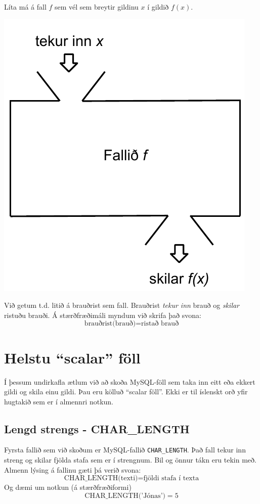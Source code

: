\begin{marginfigure}
\caption[Fall]{Líta má á fall $f$ sem vél sem breytir gildinu $x$ í gildið $f(x)$.}
\label{mynd:fall}
\centering
\includegraphics[width=\linewidth]{myndir/fall}
\end{marginfigure}

Við getum t.d. litið á brauðrist sem fall. Brauðrist \emph{tekur inn} brauð og \emph{skilar} ristuðu brauði. Á stærðfræðimáli myndum við skrifa það svona:
\[
\text{brauðrist(brauð)} = \text{ristað brauð}
\]

\section{Helstu ``scalar'' föll}
\label{undirkafli:einindafoll}
Í þessum undirkafla ætlum við að skoða MySQL-föll sem taka inn eitt eða ekkert gildi og skila einu gildi. Þau eru kölluð ``scalar föll''. Ekki er til íslenskt orð yfir hugtakið sem er í almennri notkun.
\subsection{Lengd strengs - CHAR\_LENGTH}
Fyrsta fallið sem við skoðum er MySQL-fallið \verb|CHAR_LENGTH|. Það fall tekur inn streng og skilar fjölda stafa sem er í strengnum. Bil og önnur tákn eru tekin með. Almenn lýsing á fallinu gæti þá verið svona:
\[
\text{CHAR\_LENGTH(texti)} = \text{fjöldi stafa í texta}
\]
Og dæmi um notkun (á stærðfræðiformi)
\[
\text{CHAR\_LENGTH('Jónas')} = 5
\]

